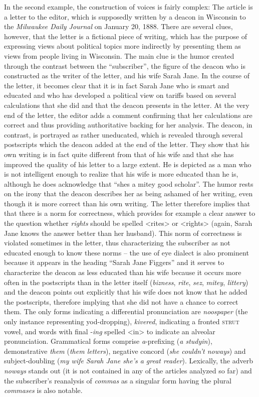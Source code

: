 In the second example, the construction of voices is fairly complex: The article is a letter to the editor, which is supposedly written by a deacon in Wisconsin to the \emph{Milwaukee Daily Journal} on January 20, 1888. There are several clues, however, that the letter is a fictional piece of writing, which has the purpose of expressing views about political topics more indirectly by presenting them as views from people living in Wisconsin. The main clue is the humor created through the contrast between the “subscriber”, the figure of the deacon who is constructed as the writer of the letter, and his wife Sarah Jane. In the course of the letter, it becomes clear that it is in fact Sarah Jane who is smart and educated and who has developed a political view on tariffs based on several calculations that she did and that the deacon presents in the letter. At the very end of the letter, the editor adds a comment confirming that her calculations are correct and thus providing authoritative backing for her analysis. The deacon, in contrast, is portrayed as rather uneducated, which is revealed through several postscripts which the deacon added at the end of the letter. They show that his own writing is in fact quite different from that of his wife and that she has improved the quality of his letter to a large extent. He is depicted as a man who is not intelligent enough to realize that his wife is more educated than he is, although he does acknowledge that “shes a mitey good scholar”. The humor rests on the irony that the deacon describes her as being ashamed of her writing, even though it is more correct than his own writing. The letter therefore implies that that there is a norm for correctness, which provides for example a clear answer to the question whether \emph{rights} should be spelled <rites> or <rights> (again, Sarah Jane knows the answer better than her husband). This norm of correctness is violated sometimes in the letter, thus characterizing the subscriber as not educated enough to know these norms – the use of eye dialect is also prominent because it appears in the heading “Sarah Jane Figgers” and it serves to characterize the deacon as less educated than his wife because it occurs more often in the postscripts than in the letter itself (\emph{bizness}, \emph{rite}, \emph{sez}, \emph{mitey}, \emph{littery}) and the deacon points out explicitly that his wife does not know that he added the postscripts, therefore implying that she did not have a chance to correct them. The only forms indicating a differential pronunciation are \emph{noospaper} (the only instance representing yod-dropping), \emph{kivered}, indicating a fronted \textsc{strut} vowel, and words with final -\emph{ing} spelled <in> to indicate an alveolar pronunciation. Grammatical forms comprise \emph{a}{}-prefixing (\emph{a studyin}), demonstrative \emph{them} (\emph{them letters}), negative concord (\emph{she couldn’t noways}) and subject-doubling (\emph{my wife Sarah Jane she’s a great reader}). Lexically, the adverb \emph{noways} stands out (it is not contained in any of the articles analyzed so far) and the subscriber’s reanalysis of \emph{commas} as a singular form having the plural \emph{commases} is also notable.

